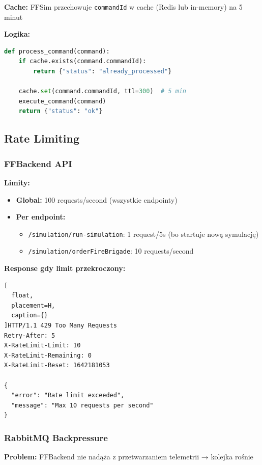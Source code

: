 \textbf{Cache:} FFSim przechowuje \texttt{commandId} w cache (Redis lub in-memory) na 5 minut

\textbf{Logika:}
\begin{lstlisting}[language=Python]
def process_command(command):
    if cache.exists(command.commandId):
        return {"status": "already_processed"}
    
    cache.set(command.commandId, ttl=300)  # 5 min
    execute_command(command)
    return {"status": "ok"}
\end{lstlisting}

\subsection{Rate Limiting}

\subsubsection{FFBackend API}

\textbf{Limity:}
\begin{itemize}
    \item \textbf{Global:} 100 requests/second (wszystkie endpointy)
    \item \textbf{Per endpoint:} 
    \begin{itemize}
        \item \texttt{/simulation/run-simulation}: 1 request/5s (bo startuje nową symulację)
        \item \texttt{/simulation/orderFireBrigade}: 10 requests/second
    \end{itemize}
\end{itemize}

\textbf{Response gdy limit przekroczony:}
\begin{lstlisting}[
  float,
  placement=H,
  caption={}
]HTTP/1.1 429 Too Many Requests
Retry-After: 5
X-RateLimit-Limit: 10
X-RateLimit-Remaining: 0
X-RateLimit-Reset: 1642181053

{
  "error": "Rate limit exceeded",
  "message": "Max 10 requests per second"
}
\end{lstlisting}

\subsubsection{RabbitMQ Backpressure}

\textbf{Problem:} FFBackend nie nadąża z przetwarzaniem telemetrii → kolejka rośnie


